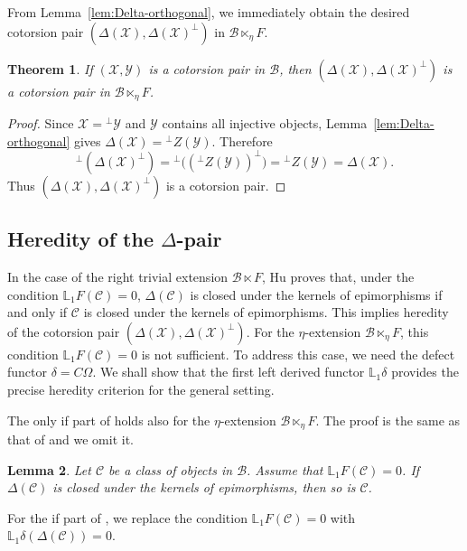 \documentclass[11pt,reqno]{amsart}
\numberwithin{equation}{section}
\newtheorem{theorem}{Theorem}[section]
\newtheorem{lemma}[theorem]{Lemma}
\newcommand{\cB}{\mathcal B}
\newcommand{\cX}{\mathcal X}
\newcommand{\cY}{\mathcal Y}
\newcommand{\cC}{\mathcal C}
\begin{document}
From Lemma~\ref{lem:Delta-orthogonal}, we immediately obtain the desired cotorsion pair $(\Delta(\cX),\Delta(\cX)^\perp)$ in $\cB\ltimes_\eta F$.

\begin{theorem}\label{thm:Delta-cotorsion}
If $(\cX,\cY)$ is a cotorsion pair in $\cB$, then
$
(\Delta(\cX),\Delta(\cX)^\perp)
$
is a cotorsion pair in $\cB\ltimes_\eta F$.
\end{theorem}

\begin{proof}
Since $\cX={}^\perp\cY$ and $\cY$ contains all injective objects, Lemma~\ref{lem:Delta-orthogonal} gives
$
\Delta(\cX)={}^\perp Z(\cY).
$
Therefore
\[
{}^\perp(\Delta(\cX)^\perp)
 ={}^\perp\bigl(({}^\perp Z(\cY))^\perp\bigr)
 ={}^\perp Z(\cY)
 =\Delta(\cX).
\]
Thus $(\Delta(\cX),\Delta(\cX)^\perp)$ is a cotorsion pair.
\end{proof}



\subsection{Heredity of the \texorpdfstring{$\Delta$}{Delta}-pair} In the case of the right trivial extension $\cB\ltimes F$, Hu \cite[Lemma 3.9]{Hu} proves that, under the condition $\mathbb{L}_1F(\cC)=0$,
$\Delta(\cC)$ is closed under the kernels of epimorphisms if and only if $\cC$ is closed under the kernels of epimorphisms. This implies heredity of
the cotorsion pair $(\Delta(\cX),\Delta(\cX)^\perp)$. For the $\eta$-extension $\cB\ltimes_\eta F$, this condition $\mathbb{L}_1F(\cC)=0$ is not sufficient. To address this case, we need the defect functor $\delta=C\Omega$. We shall show that the first left derived functor $\mathbb{L}_1\delta$ provides the precise heredity criterion for the general setting.

The only if part of \cite[Lemma 3.9]{Hu} holds also for the $\eta$-extension $\cB\ltimes_\eta F$. The proof is the same as that of \cite[Lemma 3.9]{Hu} and we omit it.

\begin{lemma}
Let $\cC$ be a class of objects in $\cB$. Assume that $\mathbb{L}_1F(\cC)=0$. If $\Delta(\cC)$ is closed under the kernels of epimorphisms, then so is $\cC$.
\end{lemma}


For the if part of \cite[Lemma 3.9]{Hu}, we replace the condition $\mathbb{L}_1F(\cC)=0$ with $\mathbb{L}_1\delta(\Delta(\cC))=0$.
\end{document}
